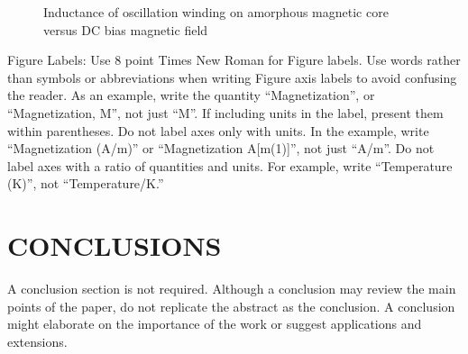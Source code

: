 \documentclass[letterpaper, 10 pt, conference]{ieeeconf}  %
\begin{document}
   \begin{figure}[thpb]
      \centering
      \caption{Inductance of oscillation winding on amorphous
       magnetic core versus DC bias magnetic field}
      \label{figurelabel}
   \end{figure}
   

Figure Labels: Use 8 point Times New Roman for Figure labels. Use words rather than symbols or abbreviations when writing Figure axis labels to avoid confusing the reader. As an example, write the quantity “Magnetization”, or “Magnetization, M”, not just “M”. If including units in the label, present them within parentheses. Do not label axes only with units. In the example, write “Magnetization (A/m)” or “Magnetization {A[m(1)]}”, not just “A/m”. Do not label axes with a ratio of quantities and units. For example, write “Temperature (K)”, not “Temperature/K.”

\section{CONCLUSIONS}

A conclusion section is not required. Although a conclusion may review the main points of the paper, do not replicate the abstract as the conclusion. A conclusion might elaborate on the importance of the work or suggest applications and extensions. 

\addtolength{\textheight}{-12cm}   %




\end{document}
